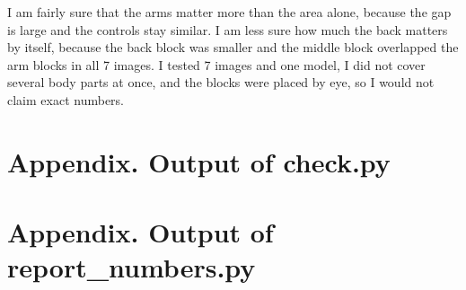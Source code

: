 \documentclass[11pt]{article}
\begin{document}
I am fairly sure that the arms matter more than the area alone, because the gap is large and the controls stay similar. I am less sure how much the back matters by itself, because the back block was smaller and the middle block overlapped the arm blocks in all 7 images. I tested 7 images and one model, I did not cover several body parts at once, and the blocks were placed by eye, so I would not claim exact numbers.

\section*{Appendix. Output of check.py}

\section*{Appendix. Output of report\_numbers.py}
\end{document}
